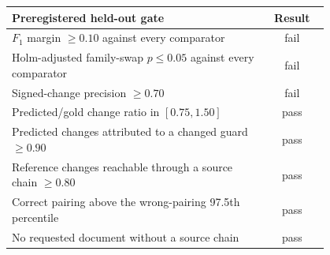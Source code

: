 \begin{tabular}{p{0.80\linewidth}c}
\toprule
Preregistered held-out gate & Result \\
\midrule
$F_1$ margin $\geq 0.10$ against every comparator & fail \\
Holm-adjusted family-swap $p\leq 0.05$ against every comparator & fail \\
Signed-change precision $\geq 0.70$ & fail \\
Predicted/gold change ratio in $[0.75,1.50]$ & pass \\
Predicted changes attributed to a changed guard $\geq 0.90$ & pass \\
Reference changes reachable through a source chain $\geq 0.80$ & pass \\
Correct pairing above the wrong-pairing 97.5th percentile & pass \\
No requested document without a source chain & pass \\
\bottomrule
\end{tabular}
